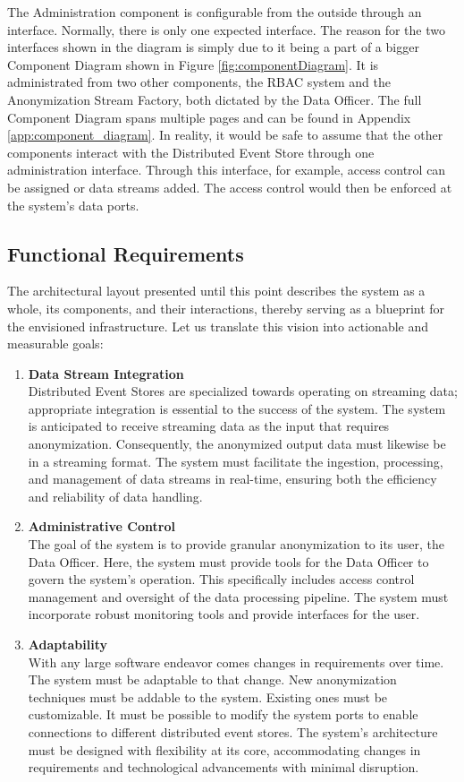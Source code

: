 The Administration component is configurable from the outside through an interface. Normally, there is only one expected interface. The reason for the two interfaces shown in the diagram is simply due to it being a part of a bigger Component Diagram shown in Figure \ref{fig:componentDiagram}. It is administrated from two other components, the \ac{RBAC} system and the Anonymization Stream Factory, both dictated by the Data Officer. The full Component Diagram spans multiple pages and can be found in Appendix \ref{app:component_diagram}. In reality, it would be safe to assume that the other components interact with the Distributed Event Store through one administration interface. Through this interface, for example, access control can be assigned or data streams added. The access control would then be enforced at the system's data ports. 

\subsection{Functional Requirements}

The architectural layout presented until this point describes the system as a whole, its components, and their interactions, thereby serving as a blueprint for the envisioned infrastructure. Let us translate this vision into actionable and measurable goals: \par

\begin{enumerate}
    \item \textbf{Data Stream Integration}\\ Distributed Event Stores are specialized towards operating on streaming data; appropriate integration is essential to the success of the system. The system is anticipated to receive streaming data as the input that requires anonymization. Consequently, the anonymized output data must likewise be in a streaming format. The system must facilitate the ingestion, processing, and management of data streams in real-time, ensuring both the efficiency and reliability of data handling. 
    \item \textbf{Administrative Control}\\ The goal of the system is to provide granular anonymization to its user, the Data Officer. Here, the system must provide tools for the Data Officer to govern the system's operation. This specifically includes access control management and oversight of the data processing pipeline. The system must incorporate robust monitoring tools and provide interfaces for the user.
    \item \textbf{Adaptability}\\ With any large software endeavor comes changes in requirements over time. The system must be adaptable to that change. New anonymization techniques must be addable to the system. Existing ones must be customizable. It must be possible to modify the system ports to enable connections to different distributed event stores. The system's architecture must be designed with flexibility at its core, accommodating changes in requirements and technological advancements with minimal disruption.
\end{enumerate}


